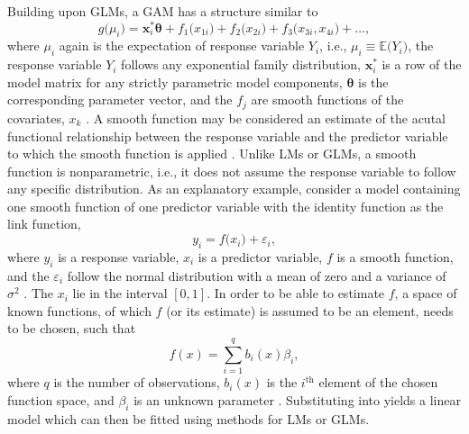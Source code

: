 Building upon GLMs, a GAM has a structure similar to
\begin{equation}
  \label{eq:GAM}
  g\bigl(\mu_i\bigr) = \symbf{x}_i^* \symbf{\theta} + f_{1}\bigl(x_{1i}\bigr) + f_{2}\bigl(x_{2i}\bigr) + f_{3}\bigl(x_{3i}, x_{4i}\bigr) + \ldots,
\end{equation}
where \(\mu_i\) again is the expectation of response variable \(Y_i\), i.e., \(\mu_i \equiv \mathbb{E}\bigl(Y_i\bigr)\), the response variable \(Y_i\) follows any exponential family distribution, \(\symbf{x}_i^*\) is a row of the model matrix for any strictly parametric model components, \(\symbf{\theta}\) is the corresponding parameter vector, and the \(f_j\) are smooth functions of the covariates, \(x_k\) \parencite{Wood2006}.  A smooth function may be considered an estimate of the acutal functional relationship between the response variable and the predictor variable to which the smooth function is applied \parencite{Hastie1991}.  Unlike LMs or GLMs, a smooth function is nonparametric, i.e., it does not assume the response variable to follow any specific distribution.
As an explanatory example, consider a model containing one smooth function of one predictor variable with the identity function as the link function,
\begin{equation}
  \label{eq:GAMSimple}
  y_i = f\bigl(x_i\bigr) + \varepsilon_i,
\end{equation}
where \(y_i\) is a response variable, \(x_i\) is a predictor variable, \(f\) is a smooth function, and the \(\varepsilon_i\) follow the normal distribution with a mean of zero and a variance of \(\sigma^2\) \parencite{Wood2006}.  The \(x_i\) lie in the interval \([0, 1]\).  In order to be able to estimate \(f\), a space of known functions, of which \(f\) (or its estimate) is assumed to be an element, needs to be chosen, such that
\begin{equation}
  \label{eq:SmoothFunctionBasis}
  f(x) = \sum_{i=1}^q b_i(x)\beta_i,
\end{equation}
where \(q\) is the number of observations, \(b_i(x)\) is the \(i^{\text{th}}\) element of the chosen function space, and \(\beta_i\) is an unknown parameter \parencite{Wood2006}.  Substituting  into  yields a linear model which can then be fitted using methods for LMs or GLMs.

